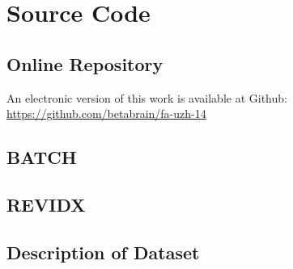 \documentclass[a4paper,12pt]{article}
\begin{document}
\appendix
\section{Source Code}
\subsection{Online Repository}
An electronic version of this work is available at Github: \\
\url{https://github.com/betabrain/fa-uzh-14}

\newpage
\subsection{BATCH}


\newpage
\subsection{REVIDX}


\newpage
\subsection{Description of Dataset}

\end{document}
